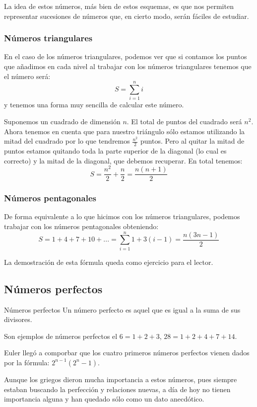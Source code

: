 \documentclass{apuntes}
\begin{document}
La idea de estos números, más bien de estos esquemas, es que nos permiten representar sucesiones de números que, en cierto modo, serán fáciles de estudiar.


\subsubsection{Números triangulares}
En el caso de los números triangulares, podemos ver que si contamos los puntos que añadimos en cada nivel al trabajar con los números triangulares tenemos que el número será:
\[S=\sum_{i=1}^ni\]
y tenemos una forma muy sencilla de calcular este número.

Suponemos un cuadrado de dimensión $n$. El total de puntos del cuadrado será $n^2$. Ahora tenemos en cuenta que para nuestro triángulo sólo estamos utilizando la mitad del cuadrado por lo que tendremos $\frac{n^2}{2}$ puntos. Pero al quitar la mitad de puntos estamos quitando toda la parte superior de la diagonal (lo cual es correcto) y la mitad de la diagonal, que debemos recuperar. En total tenemos:
\[S=\frac{n^2}{2}+\frac{n}{2} = \frac{n(n+1)}{2}\]

\subsubsection{Números pentagonales}
 De forma equivalente a lo que hicimos con los números triangulares, podemos trabajar con los números pentagonales obteniendo:
\[S = 1+4+7+10 + ... = \sum_{i=1}^n1+3(i-1) = \frac{n(3n-1)}{2}\]

La demostración de esta fórmula queda como ejercicio para el lector.

\subsection{Números perfectos}
\begin{defn}{Números perfectos}
Un número perfecto es aquel que es igual a la suma de sus divisores.

Son ejemplos de números perfectos el $6=1+2+3$, $28=1+2+4+7+14$.
\end{defn}

Euler llegó a comporbar que los cuatro primeros números perfectos vienen dados por la fórmula: $2^{n-1}(2^n-1)$.

Aunque los griegos dieron mucha importancia a estos números, pues siempre estaban buscando la perfección y relaciones nuevas, a día de hoy no tienen importancia alguna y han quedado sólo como un dato anecdótico.
\end{document}
